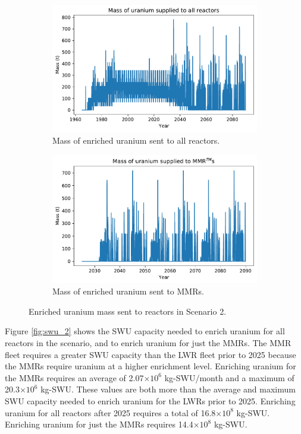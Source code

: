 \begin{figure}
    \centering
    \begin{subfigure}{0.45\textwidth}
        \centering
        \includegraphics[scale=0.4]{../figures/fuelsupply_scenarios_2.pdf}
        \caption{Mass of enriched uranium sent to all reactors.}
        \label{fig:totalfuel_2}
    \end{subfigure}
    \hspace{0.8cm}
    \begin{subfigure}{0.45\textwidth}
        \centering
        \includegraphics[scale=0.4]{../figures/advancedRX_fuelsupply_scenarios_2.pdf}
        \caption{Mass of enriched uranium sent to \glspl{MMR}.}
        \label{fig:haleu_2}
    \end{subfigure}
    \caption{Enriched uranium mass sent to reactors in Scenario 2.}
    \label{fig:fuel_2}
\end{figure}

Figure \ref{fig:swu_2} shows the \gls{SWU} capacity needed to 
enrich uranium for all reactors in the scenario, and to enrich uranium for 
just the \glspl{MMR}. The \gls{MMR} fleet requires a greater \gls{SWU} 
capacity than the \gls{LWR} fleet 
prior to 2025 because the \glspl{MMR} require uranium at a higher enrichment 
level. Enriching uranium for the \glspl{MMR} requires an average of 
2.07$\times 10^6$ kg-\gls{SWU}/month and a maximum of 20.3$\times 10^6$ 
kg-\gls{SWU}. These values are both more than the 
average and maximum \gls{SWU} capacity needed to enrich uranium for the 
\glspl{LWR} prior to 2025. Enriching uranium for all reactors after 2025 
requires a total of 16.8$\times 10^8$ kg-SWU. Enriching uranium for 
just the \glspl{MMR} requires 14.4$\times 10^8$ kg-SWU. 

